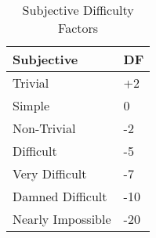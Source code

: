 

\begin{table}[h]
	\begin{tabular}{l|l}
	Subjective						& DF \\
	\hline
    Trivial			& +2 \\
	Simple			&  0 \\
	Non-Trivial	 	&  -2 \\
	Difficult		&  -5 \\
	Very Difficult  & -7 \\ 
	Damned Difficult & -10 \\
   	Nearly Impossible & -20 \\
	\end{tabular}
    \caption{Subjective Difficulty Factors}\label{Table:SubjectiveDFs}
\end{table}

